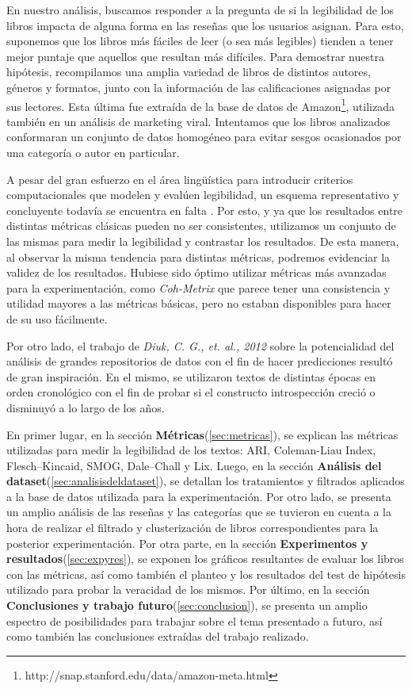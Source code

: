 \documentclass[12pt,journal,compsoc]{IEEEtran}
\begin{document}
En nuestro análisis, buscamos responder a la pregunta de si la legibilidad de los libros impacta de alguna forma en las reseñas que los usuarios asignan. Para esto, suponemos que los libros más fáciles de leer (o sea más legibles) tienden a tener mejor puntaje que aquellos que resultan más difíciles. Para demostrar nuestra hipótesis, recompilamos una amplia variedad de libros de distintos autores, géneros y formatos, junto con la información de las calificaciones asignadas por sus lectores. Esta última fue extraída de la base de datos de Amazon\footnote{http://snap.stanford.edu/data/amazon-meta.html}, utilizada también en un análisis de marketing viral\cite{leskovec}. Intentamos que los libros analizados conformaran un conjunto de datos homogéneo para evitar sesgos ocasionados por una categoría o autor en particular.

A pesar del gran esfuerzo en el área lingüística para introducir criterios computacionales que modelen y evalúen legibilidad, un esquema representativo y concluyente todavía se encuentra en falta \cite{orlow, klare, kanungo, karmakar}. Por esto, y ya que los resultados entre distintas métricas clásicas pueden no ser consistentes\cite{izgi}, utilizamos un conjunto de las mismas para medir la legibilidad y contrastar los resultados. De esta manera, al observar la misma tendencia para distintas métricas, podremos evidenciar la validez de los resultados. Hubiese sido óptimo utilizar métricas más avanzadas para la experimentación, como \textit{Coh-Metrix}\cite{graesser} que parece tener una consistencia y utilidad mayores a las métricas básicas\cite{crossley}, pero no estaban disponibles para hacer de su uso fácilmente.

Por otro lado, el trabajo de \textit{Diuk, C. G., et. al., 2012} \cite{diuk} sobre la potencialidad del análisis de grandes repositorios de datos con el fin de hacer predicciones resultó de gran inspiración. En el mismo, se utilizaron textos de distintas épocas en orden cronológico con el fin de probar si el constructo introspección creció o disminuyó a lo largo de los años. %

En primer lugar, en la sección \textbf{Métricas}(\ref{sec:metricas}), se explican las métricas utilizadas para medir la legibilidad de los textos: ARI, Coleman-Liau Index, Flesch–Kincaid, SMOG, Dale–Chall y Lix. Luego, en la sección \textbf{Análisis del dataset}(\ref{sec:analisisdeldataset}), se detallan los tratamientos y filtrados aplicados a la base de datos utilizada para la experimentación. Por otro lado, se presenta un amplio análisis de las reseñas y las categorías que se tuvieron en cuenta a la hora de realizar el filtrado y clusterización de libros correspondientes para la posterior experimentación. Por otra parte, en la sección \textbf{Experimentos y resultados}(\ref{sec:expyres}), se exponen los gráficos resultantes de evaluar los libros con las métricas, así como también el planteo y los resultados del test de hipótesis utilizado para probar la veracidad de los mismos. Por último, en la sección \textbf{Conclusiones y trabajo futuro}(\ref{sec:conclusion}), se presenta un amplio espectro de posibilidades para trabajar sobre el tema presentado a futuro, así como también las conclusiones extraídas del trabajo realizado.
\end{document}
